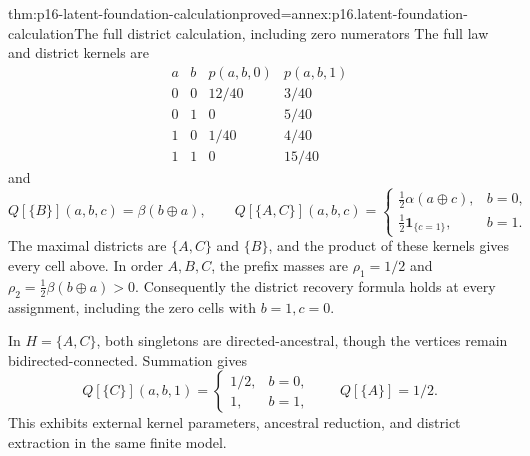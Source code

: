 \begin{hbtheorem}{thm:p16-latent-foundation-calculation}{proved=annex:p16.latent-foundation-calculation}{The full district calculation, including zero numerators}
The full law and district kernels are
\[
\begin{array}{cc|cc}
 a&b&p(a,b,0)&p(a,b,1)\\\hline
 0&0&12/40&3/40\\
 0&1&0&5/40\\
 1&0&1/40&4/40\\
 1&1&0&15/40
\end{array}
\]
and
\[
 Q[\{B\}](a,b,c)=\beta(b\oplus a),\qquad
 Q[\{A,C\}](a,b,c)=
 \begin{cases}
 \frac12\alpha(a\oplus c),&b=0,\\
 \frac12\mathbf1_{\{c=1\}},&b=1.
 \end{cases}
\]
The maximal districts are \(\{A,C\}\) and \(\{B\}\), and
the product of these kernels gives every cell above. In order
\(A,B,C\), the prefix masses are
\(\rho_1=1/2\) and \(\rho_2=\frac12\beta(b\oplus a)>0\).
Consequently the district recovery formula holds at every assignment,
including the zero cells with \(b=1,c=0\).

In \(H=\{A,C\}\), both singletons are directed-ancestral, though
the vertices remain bidirected-connected. Summation gives
\[
 Q[\{C\}](a,b,1)=
 \begin{cases}1/2,&b=0,\\1,&b=1,\end{cases}
 \qquad Q[\{A\}]=1/2.
\]
This exhibits external kernel parameters, ancestral reduction, and
district extraction in the same finite model.
\end{hbtheorem}

